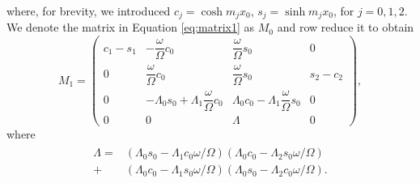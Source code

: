\documentclass[12pt]{ociamthesis}
\begin{document}
%
where, for brevity, we introduced $c_j = \cosh m_j x_0$, $s_j = \sinh m_j x_0$, for $j = 0,1,2$.
We denote the matrix in Equation \eqref{eq:matrix1} as $M_0$ and row reduce it to obtain
%
\begin{equation}
\label{eq:matrix2}
M_1 = 
\begin{pmatrix}
c_1 - s_1 
& - \dfrac{\omega}{\Omega} c_0
& \dfrac{\omega}{\Omega} s_0
& 0
\\[0.3cm]
0
& \dfrac{\omega}{\Omega} c_0
& \dfrac{\omega}{\Omega} s_0
& s_2 - c_2
\\[0.3cm]
0
& - \Lambda_0 s_0 + \Lambda_1 \dfrac{\omega}{\Omega} c_0
& \Lambda_0 c_0 - \Lambda_1 \dfrac{\omega}{\Omega} s_0
& 0
\\[0.3cm]
0
& 0
& \Lambda
& 0
\end{pmatrix},
\end{equation}
%
where
%
\begin{align}
\begin{split}
\label{eq:lambda}
\Lambda = & \left(\Lambda_0 s_0 - \Lambda_1 c_0 \omega/\Omega \right)
\left(\Lambda_0 c_0 - \Lambda_2 s_0 \omega/\Omega \right)
\\
+ & \left(\Lambda_0 c_0 - \Lambda_1 s_0 \omega/\Omega \right)
\left( \Lambda_0 s_0 - \Lambda_2 c_0 \omega/\Omega \right).
\end{split}
\end{align}
%
\end{document}
